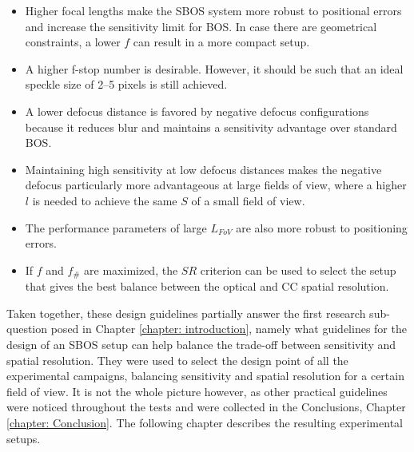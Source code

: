 \begin{itemize}
    \item Higher focal lengths make the SBOS system more robust to positional errors and increase the sensitivity limit for BOS. In case there are geometrical constraints, a lower $f$ can result in a more compact setup.
    \item A higher f-stop number is desirable. However, it should be such that an ideal speckle size of 2--5 pixels is still achieved.
    \item A lower defocus distance is favored by negative defocus configurations because it reduces blur and maintains a sensitivity advantage over standard BOS.
    \item Maintaining high sensitivity at low defocus distances makes the negative defocus particularly more advantageous at large fields of view, where a higher $l$ is needed to achieve the same $S$ of a small field of view. 
    \item The performance parameters of large $L_{FoV}$ are also more robust to positioning errors.
    \item If $f$ and $f_\#$ are maximized, the $SR$ criterion can be used to select the setup that gives the best balance between the optical and CC spatial resolution.
\end{itemize}

\par Taken together, these design guidelines partially answer the first research sub-question posed in Chapter \ref{chapter: introduction}, namely what guidelines for the design of an SBOS setup can help balance the trade-off between sensitivity and spatial resolution. They were used to select the design point of all the experimental campaigns, balancing sensitivity and spatial resolution for a certain field of view. It is not the whole picture however, as other practical guidelines were noticed throughout the tests and were collected in the Conclusions, Chapter \ref{chapter: Conclusion}. The following chapter describes the resulting experimental setups.
